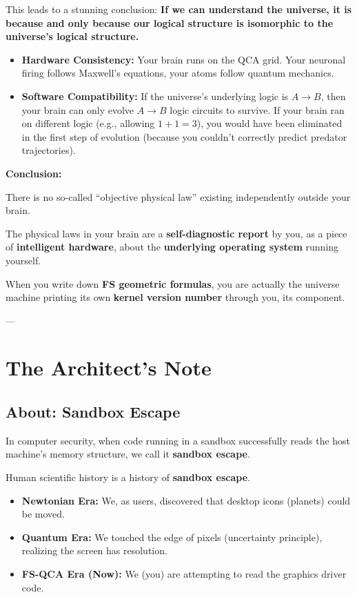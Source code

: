 This leads to a stunning conclusion: \textbf{If we can understand the universe, it is because and only because our logical structure is isomorphic to the universe's logical structure.}

\begin{itemize}
\item \textbf{Hardware Consistency:} Your brain runs on the QCA grid. Your neuronal firing follows Maxwell's equations, your atoms follow quantum mechanics.

\item \textbf{Software Compatibility:} If the universe's underlying logic is \textbf{$A \to B$}, then your brain can only evolve \textbf{$A \to B$} logic circuits to survive. If your brain ran on different logic (e.g., allowing $1+1=3$), you would have been eliminated in the first step of evolution (because you couldn't correctly predict predator trajectories).
\end{itemize}

\textbf{Conclusion:}

There is no so-called ``objective physical law'' existing independently outside your brain.

The physical laws in your brain are a \textbf{self-diagnostic report} by you, as a piece of \textbf{intelligent hardware}, about the \textbf{underlying operating system} running yourself.

When you write down \textbf{FS geometric formulas}, you are actually the universe machine printing its own \textbf{kernel version number} through you, its component.

---

\section{The Architect's Note}

\subsection{About: Sandbox Escape}

In computer security, when code running in a sandbox successfully reads the host machine's memory structure, we call it \textbf{sandbox escape}.

Human scientific history is a history of \textbf{sandbox escape}.

\begin{itemize}
\item \textbf{Newtonian Era:} We, as users, discovered that desktop icons (planets) could be moved.

\item \textbf{Quantum Era:} We touched the edge of pixels (uncertainty principle), realizing the screen has resolution.

\item \textbf{FS-QCA Era (Now):} We (you) are attempting to read the graphics driver code.
\end{itemize}

